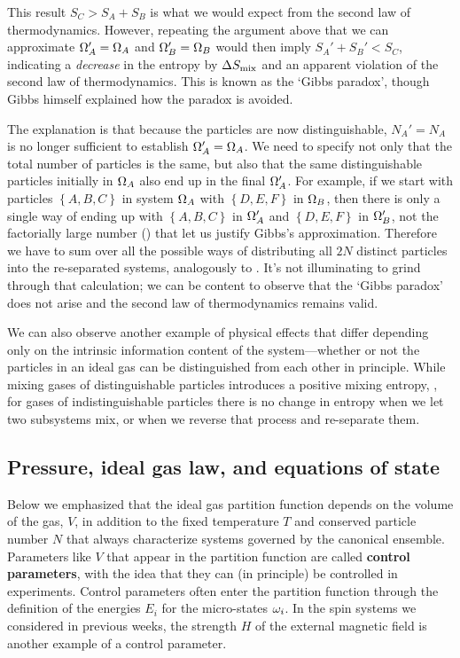 This result $S_C > S_A + S_B$ is what we would expect from the second law of thermodynamics.
However, repeating the argument above that we can approximate $\Omega_A' = \Omega_A$ and $\Omega_B' = \Omega_B$ would then imply $S_A' + S_B' < S_C$, indicating a \textit{decrease} in the entropy by $\Delta S_{\mathrm{mix}}$ and an apparent violation of the second law of thermodynamics.
This is known as the `Gibbs paradox', though Gibbs himself explained how the paradox is avoided.

The explanation is that because the particles are now distinguishable, $N_A' = N_A$ is no longer sufficient to establish $\Omega_A' = \Omega_A$.
We need to specify not only that the total number of particles is the same, but also that the same distinguishable particles initially in $\Omega_A$ also end up in the final $\Omega_A'$.
For example, if we start with particles $\left\{A, B, C\right\}$ in system $\Omega_A$ with $\left\{D, E, F\right\}$ in $\Omega_B$, then there is only a single way of ending up with $\left\{A, B, C\right\}$ in $\Omega_A'$ and $\left\{D, E, F\right\}$ in $\Omega_B'$, not the factorially large number () that let us justify Gibbs's approximation. %
Therefore we have to sum over all the possible ways of distributing all $2N$ distinct particles into the re-separated systems, analogously to .
It's not illuminating to grind through that calculation; we can be content to observe that the `Gibbs paradox' does not arise and the second law of thermodynamics remains valid.

We can also observe another example of physical effects that differ depending only on the intrinsic information content of the system---whether or not the particles in an ideal gas can be distinguished from each other in principle.
While mixing gases of distinguishable particles introduces a positive mixing entropy, , for gases of indistinguishable particles there is no change in entropy when we let two subsystems mix, or when we reverse that process and re-separate them.



\subsection{Pressure, ideal gas law, and equations of state}
Below  we emphasized that the ideal gas partition function depends on the volume of the gas, $V$, in addition to the fixed temperature $T$ and conserved particle number $N$ that always characterize systems governed by the canonical ensemble.
Parameters like $V$ that appear in the partition function are called \textbf{control parameters}, with the idea that they can (in principle) be controlled in experiments.
Control parameters often enter the partition function through the definition of the energies $E_i$ for the micro-states $\omega_i$.
In the spin systems we considered in previous weeks, the strength $H$ of the external magnetic field is another example of a control parameter.

